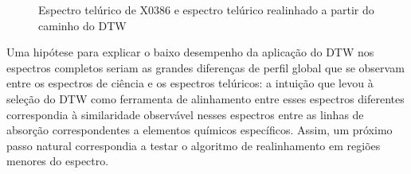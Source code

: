 \begin{figure}[H]
  \centering
  \hfill
  \caption{Espectro telúrico de X0386 e espectro telúrico realinhado a partir do caminho do DTW}
  \label{fig:x0386-realigned-telluric}
\end{figure}


Uma hipótese para explicar o baixo desempenho da aplicação do DTW nos espectros completos seriam as grandes diferenças de perfil global que se observam entre os espectros de ciência e os espectros telúricos: a intuição que levou à seleção do DTW como ferramenta de alinhamento entre esses espectros diferentes correspondia à similaridade observável nesses espectros entre as linhas de absorção correspondentes a elementos químicos específicos. Assim, um próximo passo natural correspondia a testar o algoritmo de realinhamento em regiões menores do espectro.

